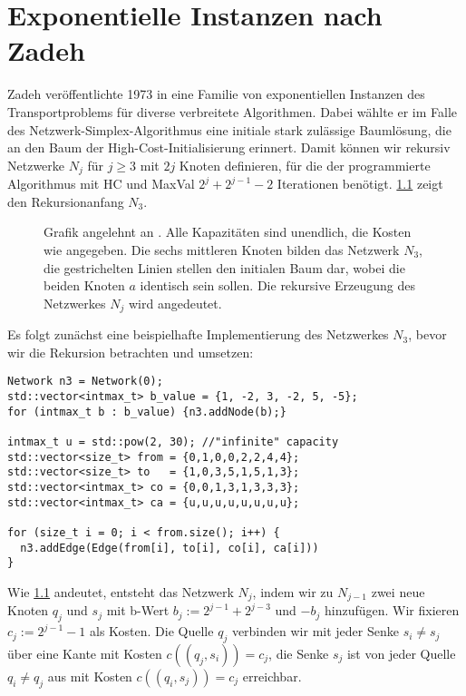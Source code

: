 \chapter{Exponentielle Instanzen nach Zadeh}\label{ch:lit}
Zadeh veröffentlichte 1973 in \cite{Exponential} eine Familie von exponentiellen Instanzen des Transportproblems für diverse verbreitete Algorithmen. Dabei wählte er im Falle des Netzwerk-Simplex-Algorithmus eine initiale stark zulässige Baumlösung, die an den Baum der High-Cost-Initialisierung erinnert. Damit können wir rekursiv Netzwerke $N_j$ für $j\geq 3$ mit $2j$ Knoten definieren, für die der programmierte Algorithmus mit HC und MaxVal $2^j + 2^{j-1} - 2$ Iterationen benötigt. \cref{fig:N3} zeigt den Rekursionanfang $N_3$.
\begin{figure}[!ht]\centering
    
    \caption{Grafik angelehnt an \cite[S. 261]{Exponential}. Alle Kapazitäten sind unendlich, die Kosten wie angegeben. Die sechs mittleren Knoten bilden das Netzwerk $N_3$, die gestrichelten Linien stellen den initialen Baum dar, wobei die beiden Knoten $a$ identisch sein sollen. Die rekursive Erzeugung des Netzwerkes $N_j$ wird angedeutet.}
    \label{fig:N3}
\end{figure}

Es folgt zunächst eine beispielhafte Implementierung des Netzwerkes $N_3$, bevor wir die Rekursion betrachten und umsetzen:

\begin{lstlisting}
Network n3 = Network(0);
std::vector<intmax_t> b_value = {1, -2, 3, -2, 5, -5};
for (intmax_t b : b_value) {n3.addNode(b);}

intmax_t u = std::pow(2, 30); //"infinite" capacity
std::vector<size_t> from = {0,1,0,0,2,2,4,4};
std::vector<size_t> to   = {1,0,3,5,1,5,1,3};
std::vector<intmax_t> co = {0,0,1,3,1,3,3,3};
std::vector<intmax_t> ca = {u,u,u,u,u,u,u,u};

for (size_t i = 0; i < from.size(); i++) {
  n3.addEdge(Edge(from[i], to[i], co[i], ca[i]))
}
\end{lstlisting}

Wie \cref{fig:N3} andeutet, entsteht das Netzwerk $N_j$, indem wir zu $N_{j-1}$ zwei neue Knoten $q_j$ und $s_j$ mit b-Wert $b_j:=2^{j-1} + 2^{j-3}$ und $-b_j$ hinzufügen. Wir fixieren $c_j:=2^{j-1}-1$ als Kosten. Die Quelle $q_j$ verbinden wir mit jeder Senke $s_i\neq s_j$ über eine Kante mit Kosten $c((q_j,s_i))=c_j$, die Senke $s_j$ ist von jeder Quelle $q_i\neq q_j$ aus mit Kosten $c((q_i,s_j))=c_j$ erreichbar.

